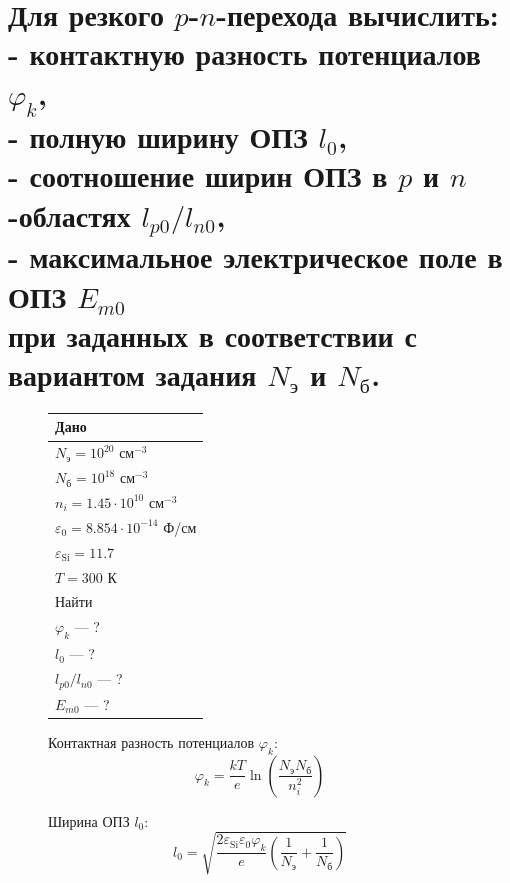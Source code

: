 \documentclass[12pt,a4paper]{article}
\theoremstyle{plain}
\theoremstyle{definition}
\theoremstyle{remark}
\numberwithin{equation}{section}
\begin{document}
\section{\large\textnormal{Для резкого $p$-$n$-перехода вычислить: \\
- контактную разность потенциалов $\varphi_k$, \\
- полную ширину ОПЗ $l_0$, \\
- соотношение ширин ОПЗ в $p$ и $n$-областях $l_{p0}/l_{n0}$, \\
- максимальное электрическое поле в ОПЗ $E_{m0}$ \\
при заданных в соответствии с вариантом задания $N_\text{э}$ и $N_\text{б}$.}}

\begin{figure}[H]
    \centering
    \begin{minipage}[t]{0.32\textwidth}
    \vspace{0em}
    \begin{tabularx}{\textwidth}{|X|}
        \hline
        \multicolumn{1}{|C|}{Дано} \\
        \hline
        $N_\text{э} = 10^{20}$ см$^{-3}$ \\ 
        $N_\text{б} = 10^{18}$ см$^{-3}$ \\
        $n_i = 1.45 \cdot 10^{10}$ см$^{-3}$ \\
        $\varepsilon_0 = 8.854 \cdot 10^{-14}$ Ф/см \\
        $\varepsilon_\text{Si} = 11.7$ \\
        $T = 300$ К \\
        \hline
        \multicolumn{1}{|C|}{Найти} \\
        \hline
        $\varphi_k$ — ? \\
        $l_0$ — ? \\
        $l_{p0}/l_{n0}$ — ? \\
        $E_{m0}$ — ? \\
        \hline
    \end{tabularx}

    \vspace{0.8em}
    Контактная разность потенциалов $\varphi_k$:
    \begin{equation*}
        \varphi_k = \frac{kT}{e}\ln\left(\frac{N_\text{э}N_\text{б}}{n_i^2}\right)
    \end{equation*}
    
    Ширина ОПЗ $l_0$:
    \begin{equation*}
        l_0 = \sqrt{\frac{2\varepsilon_\text{Si}\varepsilon_0\varphi_k}{e}\left(\frac{1}{N_\text{э}} + \frac{1}{N_\text{б}}\right)}  
    \end{equation*}


\end{minipage}
\end{figure}
\end{document}
